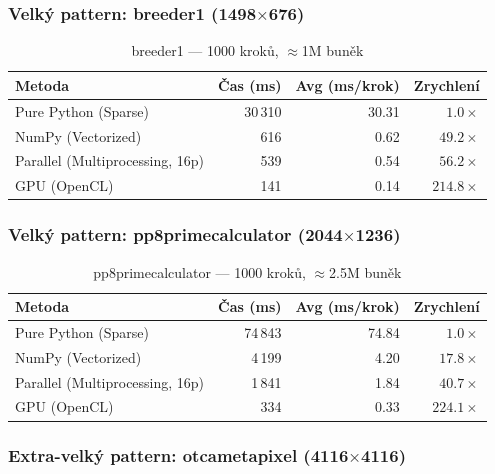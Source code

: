 \documentclass[12pt,a4paper]{article}
\begin{document}
\subsubsection{Velký pattern: breeder1 (1498$\times$676)}

\begin{table}[H]
\centering
\begin{tabular}{@{}lrrr@{}}
\toprule
\textbf{Metoda} & \textbf{Čas (ms)} & \textbf{Avg (ms/krok)} & \textbf{Zrychlení} \\
\midrule
Pure Python (Sparse)            & 30\,310  & 30.31 & $1.0\times$ \\
NumPy (Vectorized)              &    616   &  0.62 & $49.2\times$ \\
Parallel (Multiprocessing, 16p) &    539   &  0.54 & $56.2\times$ \\
GPU (OpenCL)                    &    141   &  0.14 & $214.8\times$ \\
\bottomrule
\end{tabular}
\caption{breeder1 --- 1000 kroků, $\approx$1M buněk}
\end{table}

\subsubsection{Velký pattern: pp8primecalculator (2044$\times$1236)}

\begin{table}[H]
\centering
\begin{tabular}{@{}lrrr@{}}
\toprule
\textbf{Metoda} & \textbf{Čas (ms)} & \textbf{Avg (ms/krok)} & \textbf{Zrychlení} \\
\midrule
Pure Python (Sparse)            & 74\,843  & 74.84 & $1.0\times$ \\
NumPy (Vectorized)              &  4\,199  &  4.20 & $17.8\times$ \\
Parallel (Multiprocessing, 16p) &  1\,841  &  1.84 & $40.7\times$ \\
GPU (OpenCL)                    &    334   &  0.33 & $224.1\times$ \\
\bottomrule
\end{tabular}
\caption{pp8primecalculator --- 1000 kroků, $\approx$2.5M buněk}
\end{table}

\subsubsection{Extra-velký pattern: otcametapixel (4116$\times$4116)}
\end{document}
